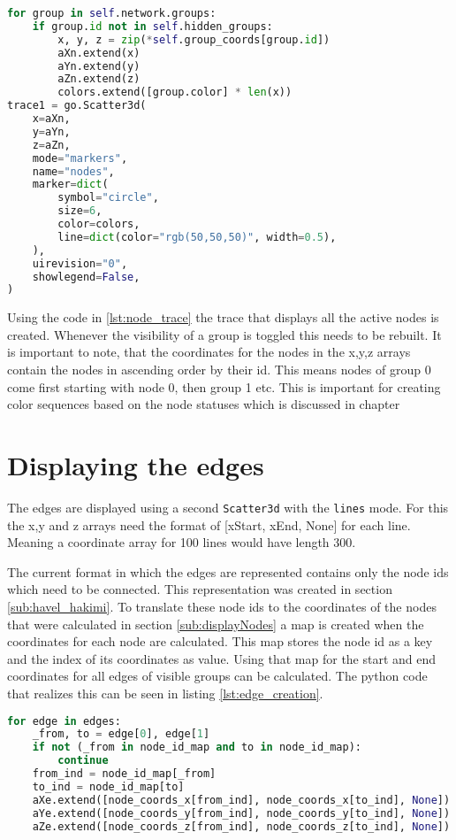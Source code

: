 \begin{lstlisting}[language=python, caption={Creation of the node trace}, label={lst:node_trace}]
for group in self.network.groups:
    if group.id not in self.hidden_groups:
        x, y, z = zip(*self.group_coords[group.id])
        aXn.extend(x)
        aYn.extend(y)
        aZn.extend(z)
        colors.extend([group.color] * len(x))
trace1 = go.Scatter3d(
    x=aXn,
    y=aYn,
    z=aZn,
    mode="markers",
    name="nodes",
    marker=dict(
        symbol="circle",
        size=6,
        color=colors,
        line=dict(color="rgb(50,50,50)", width=0.5),
    ),
    uirevision="0",
    showlegend=False,
)
\end{lstlisting}

Using the code in \ref{lst:node_trace} the trace that displays all the active nodes is created. Whenever the visibility of a group is toggled this needs to be rebuilt. It is important to note, that the coordinates for the nodes in the x,y,z arrays contain the nodes in ascending order by their id. This means nodes of group 0 come first starting with node 0, then group 1 etc. This is important for creating color sequences based on the node statuses which is discussed in chapter %

\section{Displaying the edges}
The edges are displayed using a second \texttt{Scatter3d} with the \texttt{lines} mode. For this the x,y and z arrays need the format of [xStart, xEnd, None] for each line. Meaning a coordinate array for 100 lines would have length 300.

The current format in which the edges are represented contains only the node ids which need to be connected. This representation was created in section \ref{sub:havel_hakimi}. To translate these node ids to the coordinates of the nodes that were calculated in section \ref{sub:displayNodes} a map is created when the coordinates for each node are calculated. This map stores the node id as a key and the index of its coordinates as value. Using that map for the start and end coordinates for all edges of visible groups can be calculated. The python code that realizes this can be seen in listing \ref{lst:edge_creation}.
\begin{lstlisting}[language=python, caption={Creation of the edge coordinate arrays}, label={lst:edge_creation}]
 for edge in edges:
    _from, to = edge[0], edge[1]
    if not (_from in node_id_map and to in node_id_map):
        continue
    from_ind = node_id_map[_from]
    to_ind = node_id_map[to]
    aXe.extend([node_coords_x[from_ind], node_coords_x[to_ind], None])
    aYe.extend([node_coords_y[from_ind], node_coords_y[to_ind], None])
    aZe.extend([node_coords_z[from_ind], node_coords_z[to_ind], None])
\end{lstlisting}

